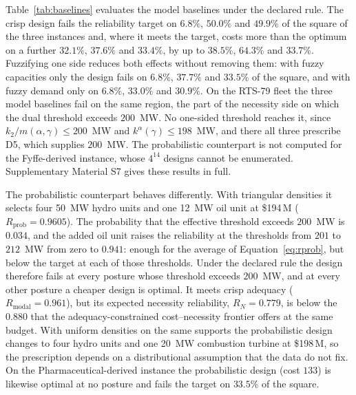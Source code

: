 \documentclass[Review,sagev,times]{sagej}%
\newcommand{\kag}{k^{\alpha}(\gamma)}\newcommand{\WS}{\tilde{W}_S}\newcommand{\Zsuf}{Z^{\mathrm{suf}}}
\begin{document}
Table~\ref{tab:baselines} evaluates the model baselines under the declared rule. The crisp design fails the
reliability target on $6.8\%$, $50.0\%$ and $49.9\%$ of the square of the three instances and, where it meets
the target, costs more than the optimum on a further $32.1\%$, $37.6\%$ and $33.4\%$, by up to $38.5\%$,
$64.3\%$ and $33.7\%$. Fuzzifying one side reduces both effects without removing them: with fuzzy capacities
only the design fails on $6.8\%$, $37.7\%$ and $33.5\%$ of the square, and with fuzzy demand only on $6.8\%$,
$33.0\%$ and $30.9\%$. On the RTS-79 fleet the three model baselines fail on the same region, the part of the
necessity side on which the dual threshold exceeds $200$~MW. No one-sided threshold reaches it, since
$k_2/m(\alpha,\gamma)\le 200$~MW and $\kag\le 198$~MW, and there all three prescribe D5, which supplies
$200$~MW. The probabilistic counterpart is not computed for the Fyffe-derived instance, whose $4^{14}$ designs
cannot be enumerated. Supplementary Material S7 gives these results in full.

The probabilistic counterpart behaves differently. With triangular densities it selects four 50~MW hydro units
and one 12~MW oil unit at \$194\,M ($R_{\mathrm{prob}}=0.9605$). The probability that the effective threshold
exceeds $200$~MW is $0.034$, and the added oil unit raises the reliability at the thresholds from $201$ to
$212$~MW from zero to $0.941$: enough for the average of Equation~\eqref{eq:rprob}, but below the target at each
of those thresholds. Under the declared rule the design therefore fails at every posture whose threshold exceeds
$200$~MW, and at every other posture a cheaper design is optimal. It meets crisp adequacy
($R_{\mathrm{modal}}=0.961$), but its expected necessity reliability, $R_N=0.779$, is below the $0.880$ that the
adequacy-constrained cost--necessity frontier offers at the same budget. With uniform densities on the same
supports the probabilistic design changes to four hydro units and one 20~MW combustion turbine at \$198\,M, so
the prescription depends on a distributional assumption that the data do not fix. On the
Pharmaceutical-derived instance the probabilistic design (cost $133$) is likewise optimal at no posture and
fails the target on $33.5\%$ of the square.
\end{document}
